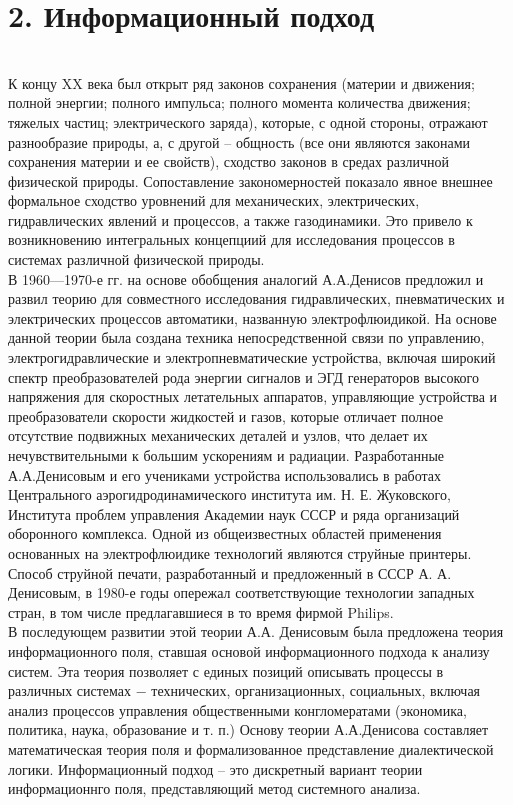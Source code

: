 \documentclass[a4paper,12pt]{report}
\begin{document}
 \chapter*{2. Информационный подход }
  \\

К концу XX века был открыт ряд законов сохранения (материи и движения; полной энергии; полного импульса; полного момента количества движения; тяжелых частиц; электрического заряда), которые, с одной стороны, отражают разнообразие природы, а, с другой – общность (все они являются законами сохранения материи и ее свойств), сходство законов в средах различной физической природы. Сопоставление закономерностей показало явное внешнее формальное сходство уровнений для механических, электрических, гидравлических явлений и процессов, а также газодинамики.  Это привело к возникновению интегральных концепциий для исследования процессов в системах различной физической природы. \\
	В 1960—1970-е гг. на основе обобщения аналогий А.А.Денисов предложил и развил теорию для совместного исследования гидравлических, пневматических и электрических процессов автоматики, названную электрофлюидикой. На основе данной теории была создана техника непосредственной связи по управлению, электрогидравлические и электропневматические устройства, включая широкий спектр преобразователей рода энергии сигналов и ЭГД генераторов высокого напряжения для скоростных летательных аппаратов, управляющие устройства и преобразователи скорости жидкостей и газов, которые отличает полное отсутствие подвижных механических деталей и узлов, что делает их нечувствительными к большим ускорениям и радиации.  Разработанные А.А.Денисовым и его учениками устройства использовались в работах Центрального аэрогидродинамического
института им. Н. Е. Жуковского, Института проблем управления Академии наук СССР и ряда организаций оборонного комплекса. Одной из общеизвестных областей применения основанных на электрофлюидике технологий являются струйные принтеры. Способ струйной печати, разработанный и предложенный в СССР А. А. Денисовым, в 1980-е годы опережал соответствующие технологии западных стран, в том числе предлагавшиеся в то время фирмой Philips.\\
	В последующем развитии этой теории А.А. Денисовым была предложена теория информационного поля, ставшая основой информационного подхода к анализу систем. Эта теория позволяет с единых позиций описывать процессы в различных системах − технических, организационных, социальных, включая анализ процессов управления общественными конгломератами (экономика, политика, наука, образование и т. п.) Основу теории А.А.Денисова составляет математическая теория поля и формализованное представление диалектической логики. Информационный подход – это дискретный вариант теории информационнго поля, представляющий метод системного анализа.\\
\end{document}
